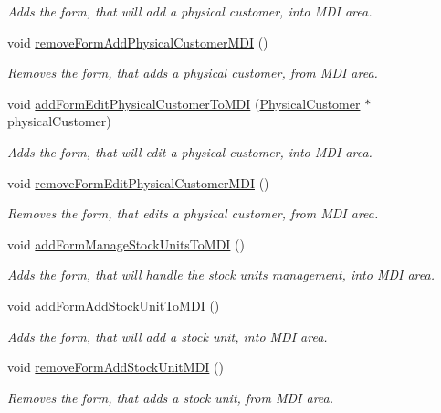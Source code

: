 \begin{DoxyCompactItemize}
\begin{DoxyCompactList}\small\item\em \-Adds the form, that will add a physical customer, into \-M\-D\-I area. \end{DoxyCompactList}\item 
void \hyperlink{class_main_window_a4fc778afcb78c22d250adb32fe9cc9dd}{remove\-Form\-Add\-Physical\-Customer\-M\-D\-I} ()
\begin{DoxyCompactList}\small\item\em \-Removes the form, that adds a physical customer, from \-M\-D\-I area. \end{DoxyCompactList}\item 
void \hyperlink{class_main_window_a95bdb567e4f0ee0e5e1ffa64a4f61179}{add\-Form\-Edit\-Physical\-Customer\-To\-M\-D\-I} (\hyperlink{class_physical_customer}{\-Physical\-Customer} $\ast$physical\-Customer)
\begin{DoxyCompactList}\small\item\em \-Adds the form, that will edit a physical customer, into \-M\-D\-I area. \end{DoxyCompactList}\item 
void \hyperlink{class_main_window_a23e545f293e9d1f5fe5b75853548b03b}{remove\-Form\-Edit\-Physical\-Customer\-M\-D\-I} ()
\begin{DoxyCompactList}\small\item\em \-Removes the form, that edits a physical customer, from \-M\-D\-I area. \end{DoxyCompactList}\item 
void \hyperlink{class_main_window_a4c64908f897d5503b7e6b93cfc84f1b8}{add\-Form\-Manage\-Stock\-Units\-To\-M\-D\-I} ()
\begin{DoxyCompactList}\small\item\em \-Adds the form, that will handle the stock units management, into \-M\-D\-I area. \end{DoxyCompactList}\item 
void \hyperlink{class_main_window_aa2fbcfe759cc60f31c3cba6738c21c5d}{add\-Form\-Add\-Stock\-Unit\-To\-M\-D\-I} ()
\begin{DoxyCompactList}\small\item\em \-Adds the form, that will add a stock unit, into \-M\-D\-I area. \end{DoxyCompactList}\item 
void \hyperlink{class_main_window_a90d37112d9104dbd367ec409532fc664}{remove\-Form\-Add\-Stock\-Unit\-M\-D\-I} ()
\begin{DoxyCompactList}\small\item\em \-Removes the form, that adds a stock unit, from \-M\-D\-I area. \end{DoxyCompactList}\item 

\end{DoxyCompactItemize}
